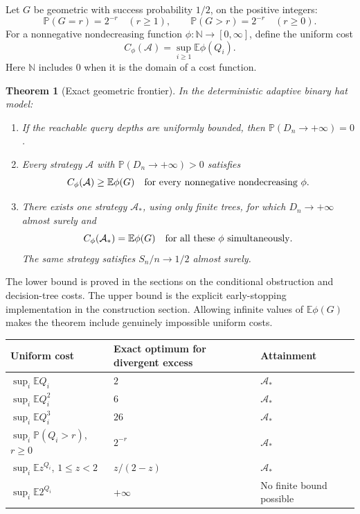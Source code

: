 \documentclass[11pt,letterpaper]{article}
\newtheorem{theorem}{Theorem}[section]
\theoremstyle{definition}
\newcommand{\N}{\mathbb N}
\newcommand{\E}{\mathbb E}
\newcommand{\Prb}{\mathbb P}
\begin{document}
Let \(G\) be geometric with success probability \(1/2\), on the positive
integers:
\[
 \Prb(G=r)=2^{-r}\quad(r\ge1),
 \qquad \Prb(G>r)=2^{-r}\quad(r\ge0).
\]
For a nonnegative nondecreasing function
\(\phi:\N\to[0,\infty]\), define the uniform cost
\[
 C_\phi(\mathcal A)=\sup_{i\ge1}\E\phi(Q_i).
\]
Here \(\N\) includes \(0\) when it is the domain of a cost function.

\begin{theorem}[Exact geometric frontier]\label{mbg:insp:thm:main-frontier}
In the deterministic adaptive binary hat model:
\begin{enumerate}
\item If the reachable query depths are uniformly bounded, then
\(\Prb(D_n\to+\infty)=0\).
\item Every strategy \(\mathcal A\) with
\(\Prb(D_n\to+\infty)>0\) satisfies
\[
 C_\phi(\mathcal A)\ge\E\phi(G)
 \quad\hbox{for every nonnegative nondecreasing }\phi.
\]
\item There exists one strategy \(\mathcal A_*\), using only finite
trees, for which \(D_n\to+\infty\) almost surely and
\[
 C_\phi(\mathcal A_*)=\E\phi(G)
 \quad\hbox{for all these }\phi\hbox{ simultaneously}.
\]
The same strategy satisfies \(S_n/n\to1/2\) almost surely.
\end{enumerate}
\end{theorem}

The lower bound is proved in the sections on the conditional
obstruction and decision-tree costs. The upper bound is the explicit
early-stopping implementation in the construction section. Allowing
infinite values of \(\E\phi(G)\) makes the theorem include genuinely
impossible uniform costs.

\begin{center}
\begin{tabular}{lll}
\toprule
Uniform cost & Exact optimum for divergent excess & Attainment\\
\midrule
\(\sup_i\E Q_i\) & \(2\) & \(\mathcal A_*\)\\
\(\sup_i\E Q_i^2\) & \(6\) & \(\mathcal A_*\)\\
\(\sup_i\E Q_i^3\) & \(26\) & \(\mathcal A_*\)\\
\(\sup_i\Prb(Q_i>r)\), \(r\ge0\) & \(2^{-r}\) & \(\mathcal A_*\)\\
\(\sup_i\E z^{Q_i}\), \(1\le z<2\) &
\(z/(2-z)\) & \(\mathcal A_*\)\\
\(\sup_i\E 2^{Q_i}\) & \(+\infty\) & No finite bound possible\\
\bottomrule
\end{tabular}
\end{center}
\end{document}

